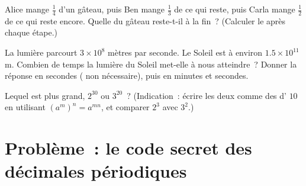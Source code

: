 \begin{exercise}[$\star\star$]\label{exo:g9:fractions:8}
Alice mange $\frac14$ d'un gâteau, puis Ben mange $\frac13$ de ce qui
reste, puis Carla mange $\frac12$ de ce qui reste encore. Quelle
 du gâteau reste-t-il à la fin~? (Calculer le  après
chaque étape.)
\end{exercise}

\begin{exercise}[$\star\star$]\label{exo:g9:fractions:9}
La lumière parcourt $3 \times 10^8$ mètres par seconde. Le Soleil est
à environ $1.5 \times 10^{11}$ m. Combien de temps la lumière du Soleil
met-elle à nous atteindre~? Donner la réponse en secondes ( non nécessaire), puis en minutes et secondes.
\end{exercise}

\begin{exercise}[$\star\star\star$]\label{exo:g9:fractions:10}
Lequel est plus grand, $2^{30}$ ou $3^{20}$~? (Indication~: écrire les
deux comme des  d' $10$ en utilisant
$\left(a^m\right)^n = a^{mn}$, et comparer $2^3$ avec $3^2$.)
\end{exercise}

\section{Problème~: le code secret des décimales périodiques}

